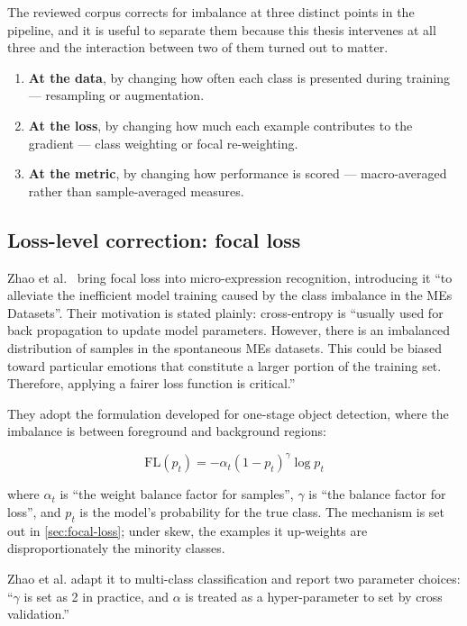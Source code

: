 The reviewed corpus corrects for imbalance at three distinct points in the pipeline, and it is useful to separate them because this thesis intervenes at all three and the interaction between two of them turned out to matter.

\begin{enumerate}
	\item \textbf{At the data}, by changing how often each class is presented during training --- resampling or augmentation.
	\item \textbf{At the loss}, by changing how much each example contributes to the gradient --- class weighting or focal re-weighting.
	\item \textbf{At the metric}, by changing how performance is scored --- macro-averaged rather than sample-averaged measures.
\end{enumerate}

\subsection{Loss-level correction: focal loss}
\label{sec:imbalance-focal}

Zhao et al.~\cite{zhaoS2021} bring focal loss into micro-expression recognition, introducing it ``to alleviate the inefficient model training caused by the class imbalance in the MEs Datasets''. Their motivation is stated plainly: cross-entropy is ``usually used for back propagation to update model parameters. However, there is an imbalanced distribution of samples in the spontaneous MEs datasets. This could be biased toward particular emotions that constitute a larger portion of the training set. Therefore, applying a fairer loss function is critical.''

They adopt the formulation developed for one-stage object detection, where the imbalance is between foreground and background regions:

\[
	\text{FL}(p_t) = -\alpha_t (1 - p_t)^{\gamma}\log p_t
\]

where $\alpha_t$ is ``the weight balance factor for samples'', $\gamma$ is ``the balance factor for loss'', and $p_t$ is the model's probability for the true class. The mechanism is set out in \autoref{sec:focal-loss}; under skew, the examples it up-weights are disproportionately the minority classes.

Zhao et al. adapt it to multi-class classification and report two parameter choices: ``$\gamma$ is set as 2 in practice, and $\alpha$ is treated as a hyper-parameter to set by cross validation.''

